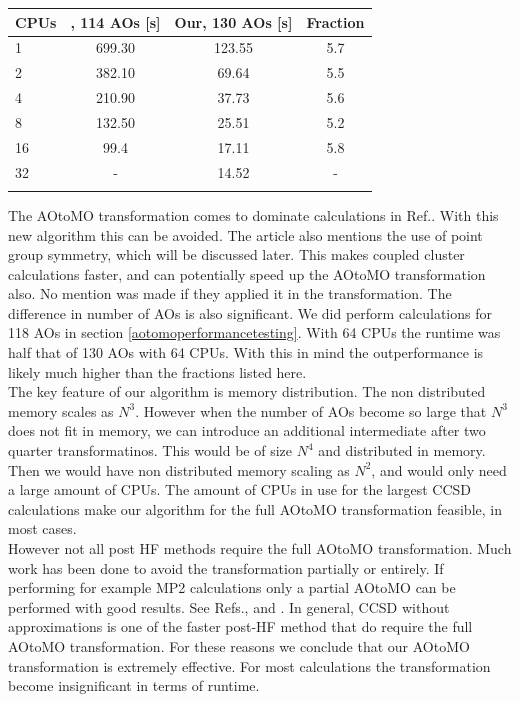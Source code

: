 \documentclass[a4paper,norsk,11pt,twoside]{report}
\begin{document}
\begin{center}
\begin{tabular}{ l c c c }
	\hline
  	CPUs & \cite{aotomo_2_cite}, 114 AOs [s] & Our, 130 AOs [s] & Fraction \\ \hline
  	1 & 699.30 & 123.55 & 5.7   \\ 
  	2 & 382.10 & 69.64  & 5.5   \\ 
  	4 & 210.90 & 37.73  &  5.6  \\
  	8 & 132.50 &  25.51 &  5.2  \\ 
  	16 & 99.4  & 17.11  & 5.8   \\ 
  	32 & - & 14.52 & -  \\ \hline
  	\\
	\end{tabular}
\end{center}

The AOtoMO transformation comes to dominate calculations in Ref.\cite{aotomo_2_cite}. With this new algorithm this can be avoided. The article also mentions the use of point group symmetry, which will be discussed later. This makes coupled cluster calculations faster, and can potentially speed up the AOtoMO transformation also. No mention was made if they applied it in the transformation. The difference in number of AOs is also significant. We did perform calculations for 118 AOs in section \ref{aotomoperformancetesting}. With 64 CPUs the runtime was half that of 130 AOs with 64 CPUs. With this in mind the outperformance is likely much higher than the fractions listed here. \\

The key feature of our algorithm is memory distribution. The non distributed memory scales as $N^3$. However when the number of AOs become so large that $N^3$ does not fit in memory, we can introduce an additional intermediate after two quarter transformatinos. This would be of size $N^4$ and distributed in memory. Then we would have non distributed memory scaling as $N^2$, and would only need a large amount of CPUs. The amount of CPUs in use for the largest CCSD calculations make our algorithm for the full AOtoMO transformation feasible, in most cases. \\

However not all post HF methods require the full AOtoMO transformation. Much work has been done to avoid the transformation partially or entirely. If performing for example MP2 calculations only a partial AOtoMO can be performed with good results. See Refs.\cite{non_aotomo_1}, \cite{non_aotomo_2} and \cite{non_aotomo_3}. In general, CCSD without approximations is one of the faster post-HF method that do require the full AOtoMO transformation. For these reasons we conclude that our AOtoMO transformation is extremely effective. For most calculations the transformation become insignificant in terms of runtime. 
\end{document}
